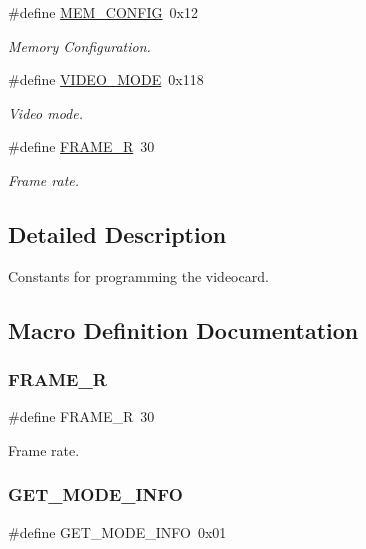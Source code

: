 \begin{DoxyCompactItemize}
$$\#define \hyperlink{group__VBE_gac45d2cccff19b29e560ab0dca3304863}{M\+E\+M\+\_\+\+C\+O\+N\+F\+IG}~0x12
\begin{DoxyCompactList}\small\item\em Memory Configuration. \end{DoxyCompactList}\item 
\#define \hyperlink{group__VBE_ga3c5cde2577e877adb5f9827014079dde}{V\+I\+D\+E\+O\+\_\+\+M\+O\+DE}~0x118
\begin{DoxyCompactList}\small\item\em Video mode. \end{DoxyCompactList}\item 
\#define \hyperlink{group__VBE_gad1928b0e991c50af34ed239e9bcec9fe}{F\+R\+A\+M\+E\+\_\+R}~30
\begin{DoxyCompactList}\small\item\em Frame rate. \end{DoxyCompactList}\end{DoxyCompactItemize}


\subsection{Detailed Description}
Constants for programming the videocard. 

\subsection{Macro Definition Documentation}
\mbox{\label{group__VBE_gad1928b0e991c50af34ed239e9bcec9fe}} 
\subsubsection{\texorpdfstring{F\+R\+A\+M\+E\+\_\+R}{FRAME\_R}}
{\footnotesize\ttfamily \#define F\+R\+A\+M\+E\+\_\+R~30}



Frame rate. 

\mbox{\label{group__VBE_ga0240cce19268c3ac2de090e8f718b89a}} 
\subsubsection{\texorpdfstring{G\+E\+T\+\_\+\+M\+O\+D\+E\+\_\+\+I\+N\+FO}{GET\_MODE\_INFO}}
{\footnotesize\ttfamily \#define G\+E\+T\+\_\+\+M\+O\+D\+E\+\_\+\+I\+N\+FO~0x01}



